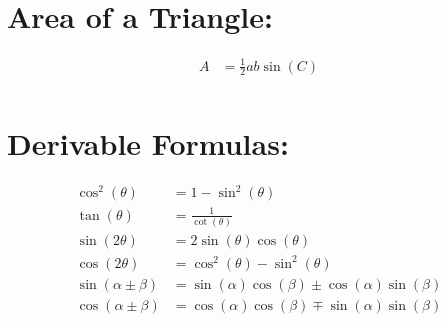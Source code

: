 \documentclass[twocolumn]{article}
\begin{document}
\section*{Area of a Triangle:}
\begin{align*}
    A &= \frac{1}{2}ab\sin(C) \\
\end{align*}

\section*{Derivable Formulas:}
\begin{align*}
    \cos^2(\theta) &= 1 - \sin^2(\theta) \\
    \tan(\theta) &= \frac{1}{\cot(\theta)} \\
    \sin(2\theta) &= 2\sin(\theta)\cos(\theta) \\
    \cos(2\theta) &= \cos^2(\theta) - \sin^2(\theta) \\
    \sin(\alpha \pm \beta) &= \sin(\alpha)\cos(\beta) \pm \cos(\alpha)\sin(\beta) \\
    \cos(\alpha \pm \beta) &= \cos(\alpha)\cos(\beta) \mp \sin(\alpha)\sin(\beta) \\
\end{align*}
\end{document}
